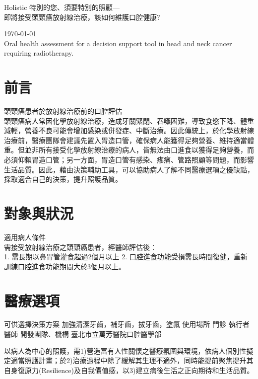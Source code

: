 \documentclass[12pt, a4paper]{article}
\begin{document}


{\LARGE
Holistic 特別的您、須要特別的照顧---\\

即將接受頭頸癌放射線治療，該如何維護口腔健康?}



\today\\
Oral health assessment for a decision support tool in head and neck cancer requiring radiotherapy.

\section{前言}
頭頸癌患者於放射線治療前的口腔評估\\
頭頸癌病人常因化學放射線治療，造成牙關緊閉、吞嚥困難，導致食慾下降、體重減輕，營養不良可能會增加感染或併發症、中斷治療。因此傳統上，於化學放射線治療前，醫療團隊會建議先置入胃造口管，確保病人能獲得足夠營養、維持適當體重。但並非所有接受化學放射線治療的病人，皆無法由口進食以獲得足夠營養，而必須仰賴胃造口管；另一方面，胃造口管有感染、疼痛、管路照顧等問題，而影響生活品質。因此，藉由決策輔助工具，可以協助病人了解不同醫療選項之優缺點，採取適合自己的決策，提升照護品質。
\section{對象與狀況}
適用病人條件\\	需接受放射線治療之頭頸癌患者，經醫師評估後：\\
1. 需長期以鼻胃管灌食超過2個月以上 
2. 口腔進食功能受損需長時間復健，重新訓練口腔進食功能期間大於3個月以上。

\section{醫療選項}
可供選擇決策方案	加強清潔牙齒，補牙齒，拔牙齒，塗氟
使用場所 門診
執行者	醫師
開發團隊、機構	臺北市立萬芳醫院口腔醫學部

    以病人為中心的照護，需1)營造富有人性關懷之醫療氛圍與環境，依病人個別性擬定適當照護計畫；於2)治療過程中除了緩解其生理不適外，同時能提前聚焦提升其自身復原力(Resilience)及自我價值感，以3)建立病後生活之正向期待和生活品質。
\end{document}
